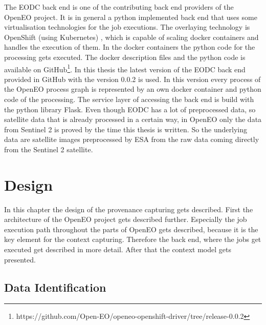 \documentclass[draft,final]{vutinfth} %
\begin{document}
 The EODC back end is one of the contributing back end providers of the OpenEO project. It is in general a python implemented back end that uses some virtualisation technologies for the job executions. The overlaying technology is OpenShift (using Kubernetes) \cite{openshift}, which is capable of scaling docker containers and handles the execution of them. In the docker containers the python code for the processing gets executed. The docker description files and the python code is available on GitHub\footnote{https://github.com/Open-EO/openeo-openshift-driver/tree/release-0.0.2}. In this thesis the latest version of the EODC back end provided in GitHub with the version 0.0.2 is used. In this version every process of the OpenEO process graph is represented by an own docker container and python code of the processing. The service layer of accessing the back end is build with the python library Flask. Even though EODC has a lot of preprocessed data, so satellite data that is already processed in a certain way, in OpenEO only the data from Sentinel 2 is proved by the time this thesis is written. So the underlying data are satellite images preprocessed by ESA from the raw data coming directly from the Sentinel 2 satellite. 
 
\chapter{Design}\label{Design}
In this chapter the design of the provenance capturing gets described. First the architecture of the OpenEO project gets described further. Especially the job execution path throughout the parts of OpenEO gets described, because it is the key element for the context capturing. Therefore the back end, where the jobs get executed get described in more detail. After that the context model gets presented. 


\section{Data Identification}\label{Design:Data Identification}
\end{document}
